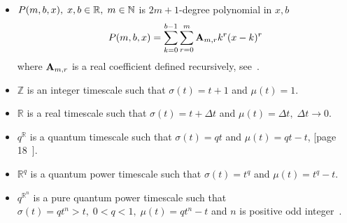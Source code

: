\begin{itemize}
    \item $P ( m, b, x ), \; x,b\in\mathbb{R}, \; m\in\mathbb{N}$ is $2m+1$-degree
    polynomial in $x,b$
    \begin{equation}
        P ( m, b, x ) = \sum_{k=0}^{b-1} \sum_{r=0}^{m} {\mathbf{A}} \sb{m,r} k^r(x-k)^r
        \label{eq:polynomial_p}
    \end{equation}
    where ${\mathbf{A}} \sb{m,r}$ is a real coefficient defined recursively, see~\cite{kolosov2016link}.

    \item $\mathbb{Z}$ is an integer timescale such that $\sigma(t) = t+1$ and $\mu(t) = 1$.

    \item $\mathbb{R}$ is a real timescale such that $\sigma(t) = t+\Delta t$ and $\mu(t) = \Delta t, \; \Delta t \to 0$.

    \item $q^\mathbb{R}$ is a quantum timescale such that $\sigma(t) = qt$ and $\mu(t) = qt - t$,
    [page 18~\cite{Bohner2001DynamicEO}].

    \item $\mathbb{R}^q$ is a quantum power timescale such that $\sigma(t) = t^q$ and $\mu(t) = t^q - t$.

    \item $q^{\mathbb{R}^n}$ is a pure quantum power timescale
    such that $\sigma(t) = qt^n > t, \; 0<q<1, \; \mu(t) = qt^n - t$ and $n$ is positive
    odd integer~\cite{aldwoah2011power}.
\end{itemize}
